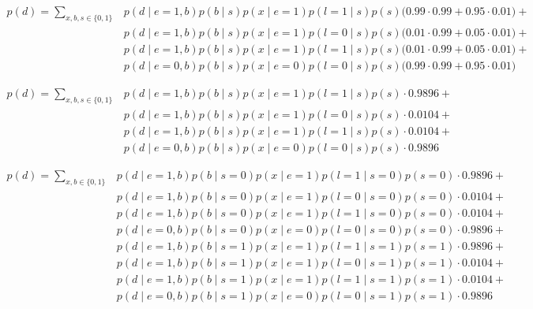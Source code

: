 \documentclass[12pt]{report}
\begin{document}
\begin{align*}    
    p(d) = \sum_{x,b,s \in \{0,1\}}  
        &p(d\mid e=1,b)p(b\mid s)p(x\mid e=1)p(l=1\mid s)p(s) \Bigg( 0.99 \cdot 0.99 + 0.95 \cdot 0.01 \Bigg) + \\
        &p(d\mid e=1,b)p(b\mid s)p(x\mid e=1)p(l=0\mid s)p(s) \Bigg( 0.01 \cdot 0.99 + 0.05 \cdot 0.01 \Bigg) + \\ 
        &p(d\mid e=1,b)p(b\mid s)p(x\mid e=1)p(l=1\mid s)p(s) \Bigg( 0.01 \cdot 0.99 + 0.05 \cdot 0.01 \Bigg) + \\
        &p(d\mid e=0,b)p(b\mid s)p(x\mid e=0)p(l=0\mid s)p(s) \Bigg( 0.99 \cdot 0.99 + 0.95 \cdot 0.01 \Bigg)
\end{align*}





\begin{align*}    
    p(d) = \sum_{x,b,s \in \{0,1\}}  
        &p(d\mid e=1,b)p(b\mid s)p(x\mid e=1)p(l=1\mid s)p(s) \cdot 0.9896 + \\
        &p(d\mid e=1,b)p(b\mid s)p(x\mid e=1)p(l=0\mid s)p(s) \cdot 0.0104 + \\ 
        &p(d\mid e=1,b)p(b\mid s)p(x\mid e=1)p(l=1\mid s)p(s) \cdot 0.0104 + \\
        &p(d\mid e=0,b)p(b\mid s)p(x\mid e=0)p(l=0\mid s)p(s) \cdot 0.9896
\end{align*}



\begin{align*}    
    p(d) = \sum_{x,b \in \{0,1\}}  
        &p(d\mid e=1,b)p(b\mid s=0)p(x\mid e=1)p(l=1\mid s=0)p(s=0) \cdot 0.9896 + \\
        &p(d\mid e=1,b)p(b\mid s=0)p(x\mid e=1)p(l=0\mid s=0)p(s=0) \cdot 0.0104 + \\ 
        &p(d\mid e=1,b)p(b\mid s=0)p(x\mid e=1)p(l=1\mid s=0)p(s=0) \cdot 0.0104 + \\
        &p(d\mid e=0,b)p(b\mid s=0)p(x\mid e=0)p(l=0\mid s=0)p(s=0) \cdot 0.9896 + \\        
        &p(d\mid e=1,b)p(b\mid s=1)p(x\mid e=1)p(l=1\mid s=1)p(s=1) \cdot 0.9896 + \\
        &p(d\mid e=1,b)p(b\mid s=1)p(x\mid e=1)p(l=0\mid s=1)p(s=1) \cdot 0.0104 + \\ 
        &p(d\mid e=1,b)p(b\mid s=1)p(x\mid e=1)p(l=1\mid s=1)p(s=1) \cdot 0.0104 + \\
        &p(d\mid e=0,b)p(b\mid s=1)p(x\mid e=0)p(l=0\mid s=1)p(s=1) \cdot 0.9896
\end{align*}
\end{document}
